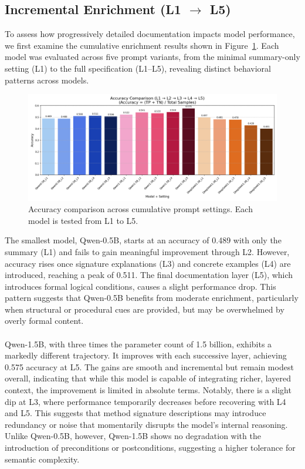 \documentclass[a4paper]{usiinfbachelorproject}
\begin{document}
\subsection{Incremental Enrichment (L1 $\rightarrow$ L5)}

To assess how progressively detailed documentation impacts model performance, we first examine the cumulative enrichment results shown in Figure~\ref{fig:acc-l1-l5}. Each model was evaluated across five prompt variants, from the minimal summary-only setting (L1) to the full specification (L1–L5), revealing distinct behavioral patterns across models.
\begin{figure}[H]\centering
  \includegraphics[width=0.95\linewidth]{figures/accuracy_comparison.png}
  \caption{Accuracy comparison across cumulative prompt settings. Each model is tested from L1 to L5.}
  \label{fig:acc-l1-l5}
\end{figure}
\noindent
The smallest model, Qwen-0.5B, starts at an accuracy of 0.489 with only the summary (L1) and fails to gain meaningful improvement through L2. However, accuracy rises once signature explanations (L3) and concrete examples (L4) are introduced, reaching a peak of 0.511. The final documentation layer (L5), which introduces formal logical conditions, causes a slight performance drop. This pattern suggests that Qwen-0.5B benefits from moderate enrichment, particularly when structural or procedural cues are provided, but may be overwhelmed by overly formal content. \\
\\
Qwen-1.5B, with three times the parameter count of 1.5 billion, exhibits a markedly different trajectory. It improves with each successive layer, achieving 0.575 accuracy at L5. The gains are smooth and incremental but remain modest overall, indicating that while this model is capable of integrating richer, layered context, the improvement is limited in absolute terms. Notably, there is a slight dip at L3, where performance temporarily decreases before recovering with L4 and L5. This suggests that method signature descriptions may introduce redundancy or noise that momentarily disrupts the model's internal reasoning. Unlike Qwen-0.5B, however, Qwen-1.5B shows no degradation with the introduction of preconditions or postconditions, suggesting a higher tolerance for semantic complexity. \\
\end{document}
